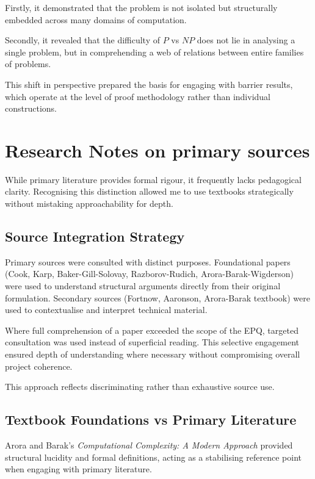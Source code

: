 \documentclass[12pt]{article}
\begin{document}
Firstly, it demonstrated that the problem is not isolated but structurally embedded across many domains of computation.

Secondly, it revealed that the difficulty of $P$ vs $NP$ does not lie in analysing a single problem, but in comprehending a web of relations between entire families of problems.

This shift in perspective prepared the basis for engaging with barrier results, which operate at the level of proof methodology rather than individual constructions.

\section{Research Notes on primary sources}

While primary literature provides formal rigour, it frequently lacks pedagogical clarity. Recognising this distinction allowed me to use textbooks strategically without mistaking approachability for depth.

\subsection{Source Integration Strategy}

Primary sources were consulted with distinct purposes.
Foundational papers (Cook, Karp, Baker-Gill-Solovay, Razborov-Rudich, Arora-Barak-Wigderson) were used to understand structural arguments directly from their original formulation.
Secondary sources (Fortnow, Aaronson, Arora-Barak textbook) were used to contextualise and interpret technical material.

Where full comprehension of a paper exceeded the scope of the EPQ, targeted consultation was used instead of superficial reading.
This selective engagement ensured depth of understanding where necessary without compromising overall project coherence.

This approach reflects discriminating rather than exhaustive source use.

\subsection{Textbook Foundations vs Primary Literature}

Arora and Barak's \textit{Computational Complexity: A Modern Approach} provided structural lucidity and formal definitions, acting as a stabilising reference point when engaging with primary literature.
\end{document}
